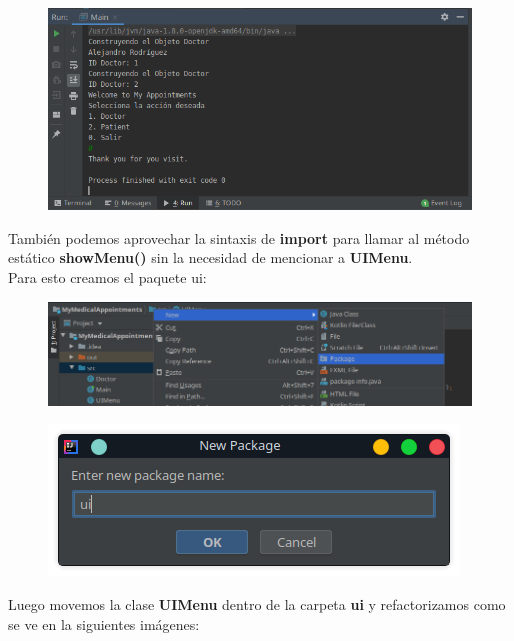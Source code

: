 \documentclass{article}
\begin{document}
\newpage

\begin{figure}[h!]
  \centering
  \includegraphics[scale=0.75]{./Pictures/018_static_proyecto.png}
\end{figure}

También podemos aprovechar la sintaxis de \textbf{import} para llamar al método
estático \textbf{showMenu()} sin la necesidad de mencionar a \textbf{UIMenu}.\\

Para esto creamos el paquete ui:

\begin{figure}[h!]
  \centering
  \includegraphics[scale=0.75]{./Pictures/019_package.png}
\end{figure}

\begin{figure}[h!]
  \centering
  \includegraphics[scale=0.75]{./Pictures/020_nombre_package.png}
\end{figure}

Luego movemos la clase \textbf{UIMenu} dentro de la carpeta \textbf{ui} y
refactorizamos como se ve en la siguientes imágenes:
\end{document}
